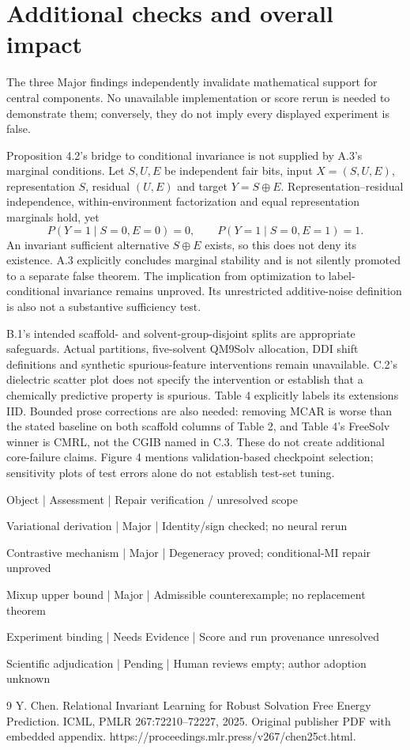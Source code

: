 \documentclass[10pt]{article}
\begin{document}
\section*{Additional checks and overall impact}
The three Major findings independently invalidate mathematical support for central components. No unavailable implementation or score rerun is needed to demonstrate them; conversely, they do not imply every displayed experiment is false.\par
Proposition 4.2’s bridge to conditional invariance is not supplied by A.3’s marginal conditions. Let \(S,U,E\) be independent fair bits, input \(X=(S,U,E)\), representation \(S\), residual \((U,E)\) and target \(Y=S\oplus E\). Representation–residual independence, within-environment factorization and equal representation marginals hold, yet \[P(Y=1\mid S=0,E=0)=0,\qquad
 P(Y=1\mid S=0,E=1)=1.\] An invariant sufficient alternative \(S\oplus E\) exists, so this does not deny its existence. A.3 explicitly concludes marginal stability and is not silently promoted to a separate false theorem. The implication from optimization to label-conditional invariance remains unproved. Its unrestricted additive-noise definition is also not a substantive sufficiency test.\par
B.1’s intended scaffold- and solvent-group-disjoint splits are appropriate safeguards. Actual partitions, five-solvent QM9Solv allocation, DDI shift definitions and synthetic spurious-feature interventions remain unavailable. C.2’s dielectric scatter plot does not specify the intervention or establish that a chemically predictive property is spurious. Table 4 explicitly labels its extensions IID. Bounded prose corrections are also needed: removing MCAR is worse than the stated baseline on both scaffold columns of Table 2, and Table 4’s FreeSolv winner is CMRL, not the CGIB named in C.3. These do not create additional core-failure claims. Figure 4 mentions validation-based checkpoint selection; sensitivity plots of test errors alone do not establish test-set tuning.\par
Object | Assessment | Repair verification / unresolved scope\par
Variational derivation | Major | Identity/sign checked; no neural rerun\par
Contrastive mechanism | Major | Degeneracy proved; conditional-MI repair unproved\par
Mixup upper bound | Major | Admissible counterexample; no replacement theorem\par
Experiment binding | Needs Evidence | Score and run provenance unresolved\par
Scientific adjudication | Pending | Human reviews empty; author adoption unknown\par
9 Y. Chen. Relational Invariant Learning for Robust Solvation Free Energy Prediction. ICML, PMLR 267:72210–72227, 2025. Original publisher PDF with embedded appendix. https://proceedings.mlr.press/v267/chen25ct.html.\par
\end{document}
